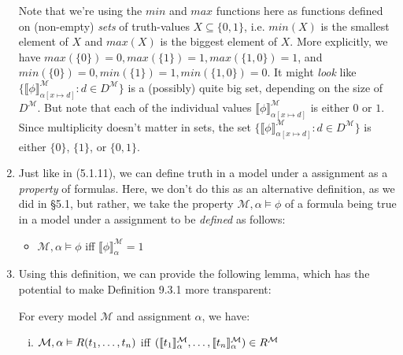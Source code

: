 \begin{enumerate}[\thesection.1]
\begin{enumerate}[(i)]
\begin{enumerate}[(a)]
				\end{enumerate}
			
		\end{enumerate}

			Note that we're using the $min$ and $max$ functions here as functions defined on (non-empty) \emph{sets} of truth-values $X\subseteq\{0,1\}$, i.e. $min(X)$ is the smallest element of $X$ and $max(X)$ is the biggest element of $X$. More explicitly, we have $max(\{0\})=0, max(\{1\})=1, max(\{1,0\})=1$, and $min(\{0\})=0, min(\{1\})=1, min(\{1,0\})=0$. It might \emph{look} like $\{\llbracket \phi\rrbracket^\mathcal{M}_{\alpha[x\mapsto d]}: d\in D^\mathcal{M}\}$ is a (possibly) quite big set, depending on the size of $D^\mathcal{M}$. But note that each of the individual values $\llbracket \phi\rrbracket^\mathcal{M}_{\alpha[x\mapsto d]}$ is either $0$ or $1$. Since multiplicity doesn't matter in sets, the set $\{\llbracket \phi\rrbracket^\mathcal{M}_{\alpha[x\mapsto d]}: d\in D^\mathcal{M}\}$ is either $\{0\}$, $\{1\}$, or $\{0,1\}$.
		
			
	  \item Just like in (5.1.11), we can define truth in a model under a assignment as a \emph{property} of formulas.
		Here, we don't do this as an alternative definition, as we did in \S5.1, but rather, we take the property
		$\mathcal{M},\alpha\vDash\phi$
		of a formula being true in a model under a assignment to be \emph{defined} as follows:
			
			\begin{itemize}
			
			  \item $\mathcal{M},\alpha\vDash\phi$
				iff
				$\llbracket\phi\rrbracket^\mathcal{M}_\alpha=1$
			
			\end{itemize}
			
	  \item Using this definition,
		we can provide the following lemma,
		which has the potential to make Definition 9.3.1 more transparent:
			
			\begin{lemma} For every model $\mathcal{M}$ and assignment $\alpha$, we have:
			
			\begin{enumerate}[(i)]
			
			  \item $\mathcal{M},\alpha\vDash R(t_1,\mathellipsis, t_n)$
				iff
				$(\llbracket t_1\rrbracket^\mathcal{M}_\alpha,\mathellipsis, \llbracket t_n\rrbracket^\mathcal{M}_\alpha)\in R^\mathcal{M}$
				

\end{enumerate}
\end{lemma}
\end{enumerate}
